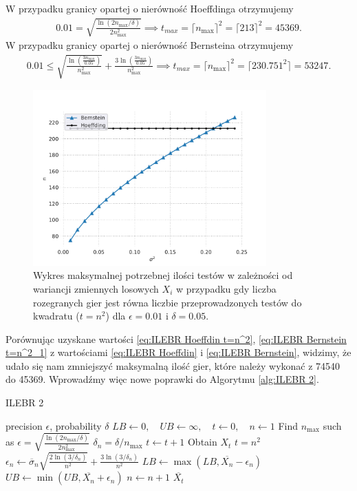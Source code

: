 \documentclass[inzynierska]{pwr_wmat_praca_dyplomowa}
\theoremstyle{plain}
\numberwithin{theorem}{chapter}
\theoremstyle{definition}
\numberwithin{theorem}{chapter}
\newcommand{\nmax}{n_{\text{max}}}
\begin{document}
	W przypadku granicy opartej o nierówność Hoeffdinga otrzymujemy
	\begin{gather}
		\label{eq:ILEBR Hoeffdin t=n^2}
		0.01 =  \sqrt{\frac{\ln(2\nmax/\delta)}{2\nmax^2}} \implies t_{max} = \lceil \nmax \rceil^2 = \lceil213\rceil^2= 45369.
	\end{gather}
	W przypadku granicy opartej o nierówność Bernsteina otrzymujemy
	\begin{gather}
		\label{eq:ILEBR Bernstein t=n^2_1}
		0.01 \le \sqrt{\frac{\ln(\frac{3\nmax}{0.05})}{\nmax^2}} + \frac{3  \ln(\frac{3\nmax}{0.05})}{\nmax^2}\implies t_{max} = \lceil \nmax \rceil^2 = \lceil230.751^2\rceil= 53247. 
	\end{gather}
	\begin{figure}
		\centering
		\includegraphics[width=0.8\textwidth]{imagens/t_eq_n_q.pdf}
		\caption{Wykres maksymalnej potrzebnej ilości testów w zależności od wariancji zmiennych losowych  $X_i$ w przypadku gdy liczba rozegranych gier jest równa liczbie przeprowadzonych testów do kwadratu ($t = n^2$) dla $\epsilon=0.01$ i $\delta = 0.05$.}
		\label{fig:t_eq_n_q}
	\end{figure}
	Porównując uzyskane wartości \eqref{eq:ILEBR Hoeffdin t=n^2}, \eqref{eq:ILEBR Bernstein t=n^2_1} z wartościami \eqref{eq:ILEBR Hoeffdin} i \eqref{eq:ILEBR Bernstein}, widzimy, że udało się nam zmniejszyć maksymalną ilość gier, które należy wykonać z 74540 do 45369. Wprowadźmy więc nowe poprawki do Algorytmu \ref{alg:ILEBR 2}.
	\begin{algorithm}[H]
		\caption{ILEBR 2}\label{alg:ILEBR 2}
		\begin{algorithmic}
			\Ensure precision $\epsilon$, probability $\delta$
			\State $LB \gets 0, \quad UB \gets \infty, \quad t \gets 0, \quad n \gets 1$
			\State Find $\nmax$ such as $		\epsilon =  \sqrt{\frac{\ln(2\nmax/\delta)}{2\nmax^2}} $
			\Statex $\delta_n = \delta/\nmax$
			\While{$ UB - LB > 2\epsilon $ or $n \le \nmax$}  
			\Repeat 
			\State $t \gets t + 1$
			\State Obtain $X_t$
			\Until $t=n^2$
			\State $\epsilon_n \gets \overline{\sigma}_n \sqrt{\frac{2\ln(3/\delta_n)}{n^2}} + \frac{3  \ln{(3 / \delta_n)}}{n^2}$ 
			\State $LB \gets \max(LB, \overline{X_n} - \epsilon_n)$
			\State $UB \gets \min(UB, \overline{X_n} + \epsilon_n)$
			\State $n \gets n + 1$
			\EndWhile
			\State \Return $ \overline{X_t}$		
		\end{algorithmic}
	\end{algorithm}
\end{document}
